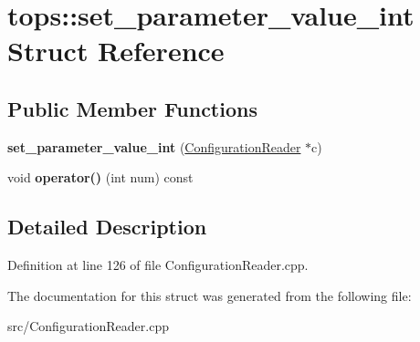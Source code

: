 \hypertarget{structtops_1_1set__parameter__value__int}{}\section{tops\+:\+:set\+\_\+parameter\+\_\+value\+\_\+int Struct Reference}
\label{structtops_1_1set__parameter__value__int}
\subsection*{Public Member Functions}
\begin{DoxyCompactItemize}
\item 
\mbox{\label{structtops_1_1set__parameter__value__int_af9b5887a892dcc560ff4a4c3cab5e28c}} 
{\bfseries set\+\_\+parameter\+\_\+value\+\_\+int} (\hyperlink{classtops_1_1ConfigurationReader}{Configuration\+Reader} $\ast$c)
\item 
\mbox{\label{structtops_1_1set__parameter__value__int_a10429c578f1ccd2852cf69263ec08fc6}} 
void {\bfseries operator()} (int num) const
\end{DoxyCompactItemize}


\subsection{Detailed Description}


Definition at line 126 of file Configuration\+Reader.\+cpp.



The documentation for this struct was generated from the following file\+:\begin{DoxyCompactItemize}
\item 
src/Configuration\+Reader.\+cpp\end{DoxyCompactItemize}
